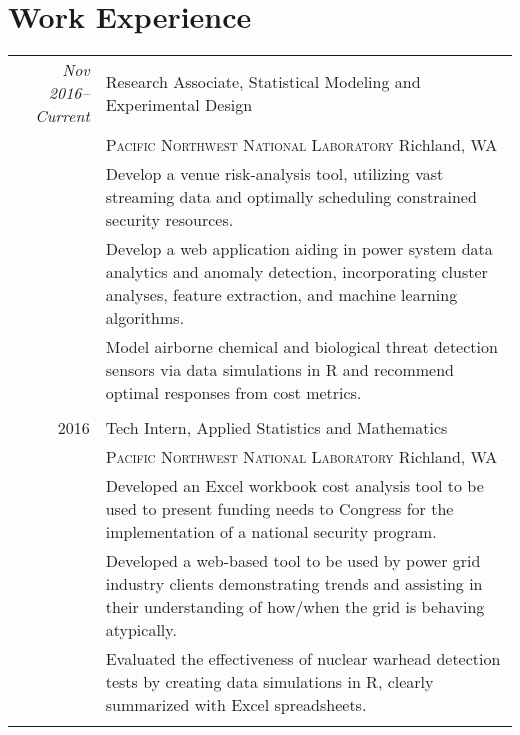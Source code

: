 \documentclass[a4paper,10pt]{article}
\begin{document}
\section{Work Experience}
\begin{tabular}{r|p{11cm}}
  \emph{Nov 2016--Current} & Research Associate, Statistical Modeling and Experimental Design \\
  & \textsc{Pacific Northwest National Laboratory} Richland, WA \\
  & \footnotesize{Develop a venue risk-analysis tool, utilizing vast streaming data and optimally scheduling constrained security resources.} \\
  & \footnotesize{Develop a web application aiding in power system data analytics and anomaly detection, incorporating cluster analyses, feature extraction, and machine learning algorithms.} \\
  & \footnotesize{Model airborne chemical and biological threat detection sensors via data simulations in R and recommend optimal responses from cost metrics.} \\ \multicolumn{2}{c}{} \\
  
  \textsc{2016} & Tech Intern, Applied Statistics and Mathematics \\
  & \textsc{Pacific Northwest National Laboratory} Richland, WA \\
  & \footnotesize{Developed an Excel workbook cost analysis tool to be used to present funding needs to Congress for the implementation of a national security program.} \\
  & \footnotesize{Developed a web-based tool to be used by power grid industry clients demonstrating trends and assisting in their understanding of how/when the grid is behaving atypically.} \\
  & \footnotesize{Evaluated the effectiveness of nuclear warhead detection tests by creating data simulations in R, clearly summarized with Excel spreadsheets.} \\ \multicolumn{2}{c}{} \\
  
\end{tabular}
\end{document}

